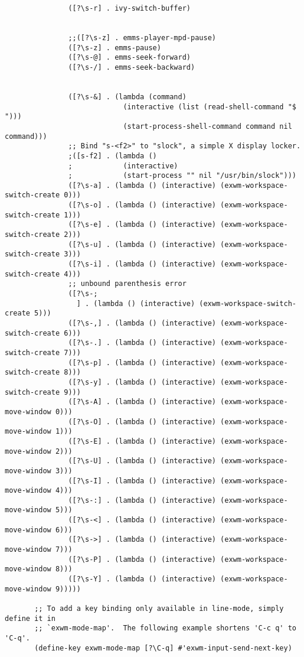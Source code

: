 \documentclass[11pt]{article}
\begin{document}
\begin{verbatim}
               ([?\s-r] . ivy-switch-buffer)


               ;;([?\s-z] . emms-player-mpd-pause)
               ([?\s-z] . emms-pause)
               ([?\s-@] . emms-seek-forward)
               ([?\s-/] . emms-seek-backward)


               ([?\s-&] . (lambda (command)
                            (interactive (list (read-shell-command "$ ")))
                            (start-process-shell-command command nil command)))
               ;; Bind "s-<f2>" to "slock", a simple X display locker.
               ;([s-f2] . (lambda ()
               ;            (interactive)
               ;            (start-process "" nil "/usr/bin/slock")))
               ([?\s-a] . (lambda () (interactive) (exwm-workspace-switch-create 0)))
               ([?\s-o] . (lambda () (interactive) (exwm-workspace-switch-create 1)))
               ([?\s-e] . (lambda () (interactive) (exwm-workspace-switch-create 2)))
               ([?\s-u] . (lambda () (interactive) (exwm-workspace-switch-create 3)))
               ([?\s-i] . (lambda () (interactive) (exwm-workspace-switch-create 4)))
               ;; unbound parenthesis error
               ([?\s-;
                 ] . (lambda () (interactive) (exwm-workspace-switch-create 5)))
               ([?\s-,] . (lambda () (interactive) (exwm-workspace-switch-create 6)))
               ([?\s-.] . (lambda () (interactive) (exwm-workspace-switch-create 7)))
               ([?\s-p] . (lambda () (interactive) (exwm-workspace-switch-create 8)))
               ([?\s-y] . (lambda () (interactive) (exwm-workspace-switch-create 9)))
               ([?\s-A] . (lambda () (interactive) (exwm-workspace-move-window 0)))
               ([?\s-O] . (lambda () (interactive) (exwm-workspace-move-window 1)))
               ([?\s-E] . (lambda () (interactive) (exwm-workspace-move-window 2)))
               ([?\s-U] . (lambda () (interactive) (exwm-workspace-move-window 3)))
               ([?\s-I] . (lambda () (interactive) (exwm-workspace-move-window 4)))
               ([?\s-:] . (lambda () (interactive) (exwm-workspace-move-window 5)))
               ([?\s-<] . (lambda () (interactive) (exwm-workspace-move-window 6)))
               ([?\s->] . (lambda () (interactive) (exwm-workspace-move-window 7)))
               ([?\s-P] . (lambda () (interactive) (exwm-workspace-move-window 8)))
               ([?\s-Y] . (lambda () (interactive) (exwm-workspace-move-window 9)))))

       ;; To add a key binding only available in line-mode, simply define it in
       ;; `exwm-mode-map'.  The following example shortens 'C-c q' to 'C-q'.
       (define-key exwm-mode-map [?\C-q] #'exwm-input-send-next-key)




\end{verbatim}
\end{document}
